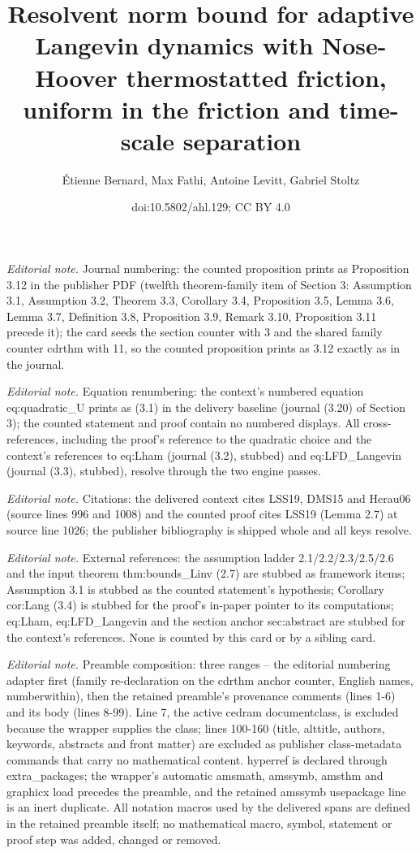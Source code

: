 \documentclass[10pt,a4paper]{article}
\title{Resolvent norm bound for adaptive Langevin dynamics with Nose-Hoover thermostatted friction, uniform in the friction and time-scale separation}
\author{Étienne Bernard, Max Fathi, Antoine Levitt, Gabriel Stoltz}
\date{doi:10.5802/ahl.129; CC BY 4.0}
\numberwithin{equation}{section}
\begin{document}
\maketitle
\setcounter{section}{3}
\setcounter{cdrthm}{11}
\setcounter{equation}{0}
\noindent\textit{Editorial note.} Journal numbering: the counted proposition prints as Proposition 3.12 in the publisher PDF (twelfth theorem-family item of Section 3: Assumption 3.1, Assumption 3.2, Theorem 3.3, Corollary 3.4, Proposition 3.5, Lemma 3.6, Lemma 3.7, Definition 3.8, Proposition 3.9, Remark 3.10, Proposition 3.11 precede it); the card seeds the section counter with 3 and the shared family counter cdrthm with 11, so the counted proposition prints as 3.12 exactly as in the journal.\par\medskip
\noindent\textit{Editorial note.} Equation renumbering: the context's numbered equation eq:quadratic\_U prints as (3.1) in the delivery baseline (journal (3.20) of Section 3); the counted statement and proof contain no numbered displays. All cross-references, including the proof's reference to the quadratic choice and the context's references to eq:Lham (journal (3.2), stubbed) and eq:LFD\_Langevin (journal (3.3), stubbed), resolve through the two engine passes.\par\medskip
\noindent\textit{Editorial note.} Citations: the delivered context cites LSS19, DMS15 and Herau06 (source lines 996 and 1008) and the counted proof cites LSS19 (Lemma 2.7) at source line 1026; the publisher bibliography is shipped whole and all keys resolve.\par\medskip
\noindent\textit{Editorial note.} External references: the assumption ladder 2.1/2.2/2.3/2.5/2.6 and the input theorem thm:bounds\_Linv (2.7) are stubbed as framework items; Assumption 3.1 is stubbed as the counted statement's hypothesis; Corollary cor:Lang (3.4) is stubbed for the proof's in-paper pointer to its computations; eq:Lham, eq:LFD\_Langevin and the section anchor sec:abstract are stubbed for the context's references. None is counted by this card or by a sibling card.\par\medskip
\noindent\textit{Editorial note.} Preamble composition: three ranges -- the editorial numbering adapter first (family re-declaration on the cdrthm anchor counter, English names, numberwithin), then the retained preamble's provenance comments (lines 1-6) and its body (lines 8-99). Line 7, the active cedram documentclass, is excluded because the wrapper supplies the class; lines 100-160 (title, alttitle, authors, keywords, abstracts and front matter) are excluded as publisher class-metadata commands that carry no mathematical content. hyperref is declared through extra\_packages; the wrapper's automatic amsmath, amssymb, amsthm and graphicx load precedes the preamble, and the retained amssymb usepackage line is an inert duplicate. All notation macros used by the delivered spans are defined in the retained preamble itself; no mathematical macro, symbol, statement or proof step was added, changed or removed.\par\medskip
\end{document}
